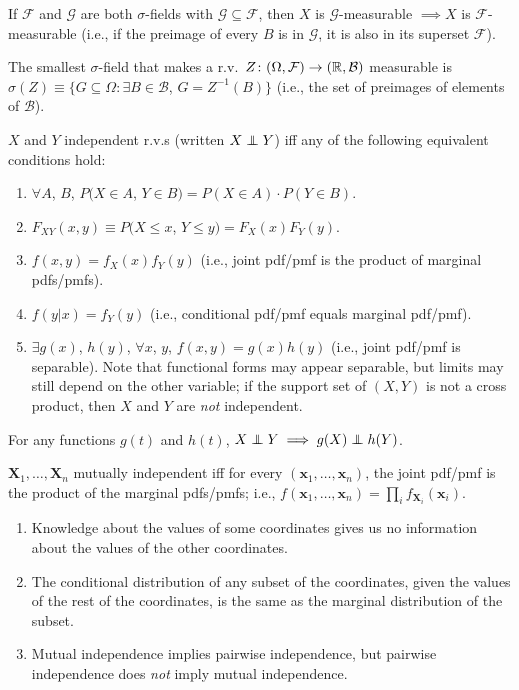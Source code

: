 \documentclass[8pt,letterpaper, landscape]{extarticle} %
\newcommand{\B}{\ensuremath{\mathcal{B}}}
\newcommand{\mX}{\ensuremath{\mathbf{X}}}
\newcommand{\mx}{\ensuremath{\mathbf{x}}}
\begin{document}
\begin{multicols}{3}
\begin{description}
If $ \mathcal{F} $ and $ \mathcal{G} $ are both $ \sigma $-fields with $ \mathcal{G} \subseteq \mathcal{F} $, then $ X $ is $ \mathcal{G} $-measurable $ \implies X $ is $ \mathcal{F} $-measurable (i.e., if the preimage of every $ B $ is in $ \mathcal{G} $, it is also in its superset $ \mathcal{F} $).

 The smallest $ \sigma $-field that makes a r.v.\ $ Z \colon (\Omega, \mathcal{F}) \to (\R, \B) $ measurable is $ \sigma (Z) \equiv \{ G \subseteq \Omega \colon \exists B \in \B $, $ G = Z^{-1} (B) \} $ (i.e., the set of preimages of elements of $ \B $).

 $ X $ and $ Y $ independent r.v.s (written $ X \independent Y $) iff any of the following equivalent conditions hold:
\begin{enumerate}
\item $ \forall A $, $ B $, $ P (X \in A $, $ Y \in B) = P (X \in A) \cdot P (Y \in B) $.
\item $ F_{XY} (x,y) \equiv P (X \leq x $, $ Y \leq y) = F_X (x) F_Y(y) $.
\item $ f(x,y) = f_{X}(x) f_Y(y) $ (i.e., joint pdf/pmf is the product of marginal pdfs/pmfs).
\item $ f(y|x) = f_Y(y) $ (i.e., conditional pdf/pmf equals marginal pdf/pmf).
\item $ \exists g(x) $, $ h(y) $, $ \forall x $, $ y $, $ f(x,y) = g(x) h(y) $ (i.e., joint pdf/pmf is separable). Note that functional forms may appear separable, but limits may still depend on the other variable; if the support set of $ (X,Y) $ is not a cross product, then $ X $ and $ Y $ are \textit{not} independent.
\end{enumerate}
For any functions $ g(t) $ and $ h(t) $, $ X \independent Y \implies g(X) \independent h(Y) $.

 $ \mX_1 , \dotsc , \mX_n $ mutually independent iff for every $ ( \mx_1 , \dotsc , \mx_n ) $, the joint pdf/pmf is the product of the marginal pdfs/pmfs; i.e.,
$ f ( \mx_1 , \dotsc , \mx_n ) = \prod_i f_{\mX_i} (\mx_i)$.
\begin{enumerate}
\item Knowledge about the values of some coordinates gives us no information about the values of the other coordinates.
\item The conditional distribution of any subset of the coordinates, given the values of the rest of the coordinates, is the same as the marginal distribution of the subset.
\item Mutual independence implies pairwise independence, but pairwise independence does \textit{not} imply mutual independence.
\end{enumerate}


\end{description}
\end{multicols}
\end{document}
